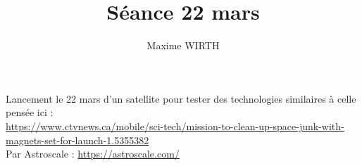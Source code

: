 \documentclass{article}
\author{Maxime WIRTH}
\title{Séance 22 mars}
\begin{document}
\maketitle

Lancement le 22 mars d'un satellite pour tester des technologies similaires à celle pensée ici :\\
\url{https://www.ctvnews.ca/mobile/sci-tech/mission-to-clean-up-space-junk-with-magnets-set-for-launch-1.5355382}\\
Par Astroscale : \url{https://astroscale.com/}
\end{document}
